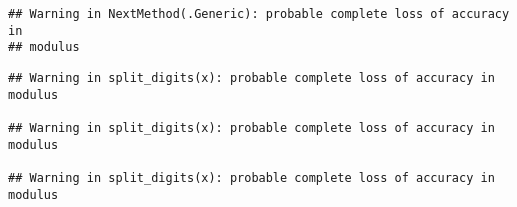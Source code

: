 \documentclass[]{article}
\newenvironment{Shaded}{\begin{snugshade}}{\end{snugshade}}
\newcommand{\KeywordTok}[1]{\textcolor[rgb]{0.13,0.29,0.53}{\textbf{#1}}}
\newcommand{\DataTypeTok}[1]{\textcolor[rgb]{0.13,0.29,0.53}{#1}}
\newcommand{\StringTok}[1]{\textcolor[rgb]{0.31,0.60,0.02}{#1}}
\newcommand{\CommentTok}[1]{\textcolor[rgb]{0.56,0.35,0.01}{\textit{#1}}}
\newcommand{\OperatorTok}[1]{\textcolor[rgb]{0.81,0.36,0.00}{\textbf{#1}}}
\newcommand{\NormalTok}[1]{#1}
\begin{document}
\begin{verbatim}
## Warning in NextMethod(.Generic): probable complete loss of accuracy in
## modulus
\end{verbatim}

\begin{verbatim}
## Warning in split_digits(x): probable complete loss of accuracy in modulus

## Warning in split_digits(x): probable complete loss of accuracy in modulus

## Warning in split_digits(x): probable complete loss of accuracy in modulus
\end{verbatim}

\begin{Shaded}
\end{Shaded}

\end{document}
